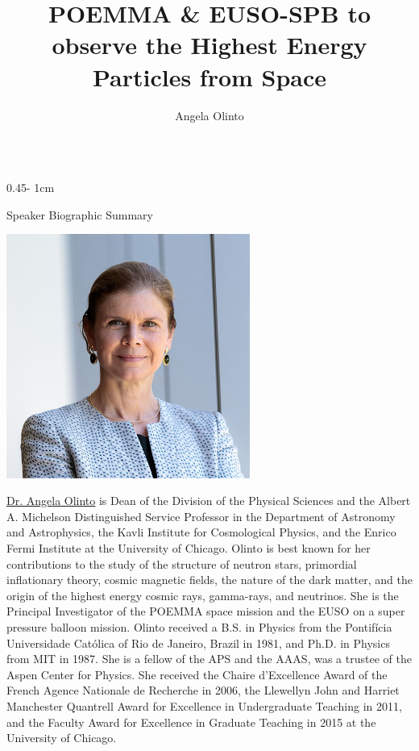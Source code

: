 \documentclass{../psuposter}
\title{POEMMA \& EUSO-SPB to observe the Highest Energy Particles from Space}
\author{Angela Olinto}
\institute{The University of Chicago}
\begin{document}
\begin{frame}
\begin{columns}[t, totalwidth=\textwidth]
\begin{column}{0.45\textwidth - 1cm}


    \begin{block}{Speaker Biographic Summary}
    	\begin{center}
    		\includegraphics[width=0.6\textwidth]{images/portrait}
    	\end{center}
    	\href{https://president.uchicago.edu/directory/angela-olinto}{Dr. Angela Olinto}  is Dean of the Division of the Physical Sciences and the Albert A. Michelson Distinguished Service Professor in the Department of Astronomy and Astrophysics, the Kavli Institute for Cosmological Physics, and the Enrico Fermi Institute at the University of Chicago. 
			Olinto is best known for her contributions to the study of the structure of neutron stars, primordial inflationary theory, cosmic magnetic fields, the nature of the dark matter, and the origin of the highest energy cosmic rays, gamma-rays, and neutrinos. She is the Principal Investigator of the POEMMA space mission and the EUSO on a super pressure balloon mission.
			Olinto received a B.S. in Physics from the Pontifícia Universidade Católica of Rio de Janeiro, Brazil in 1981, and Ph.D. in Physics from MIT in 1987. She is a fellow of the APS and the AAAS, was a trustee of the Aspen Center for Physics.
			She received the Chaire d’Excellence Award of the French Agence Nationale de Recherche in 2006, the Llewellyn John and Harriet Manchester Quantrell Award for Excellence in Undergraduate Teaching in 2011, and the Faculty Award for Excellence in Graduate Teaching in 2015 at the University of Chicago.
    \end{block}



\end{column}
\end{columns}
\end{frame}
\end{document}
